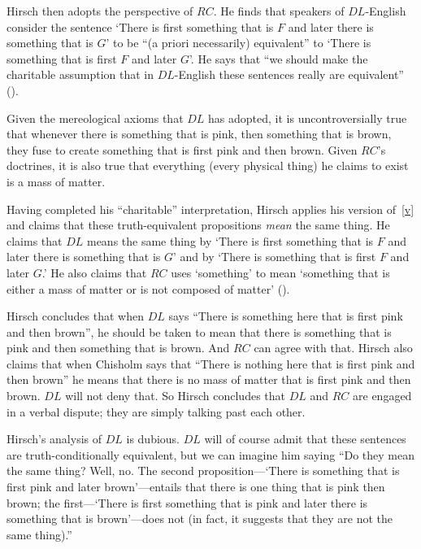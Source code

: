 \documentclass[11pt]{article}
\begin{document}
\begin{spacing}{1.25}
Hirsch then adopts the perspective of $RC$.  He finds that speakers of
$DL$-English consider the sentence `There is first something that is
$F$ and later there is something that is $G$' to be ``(a priori
necessarily) equivalent'' to `There is something that is first $F$ and
later $G$'.  He says that ``we should make the charitable assumption
that in $DL$-English these sentences really are
equivalent'' (\citeyear[78]{hirsch2005}).

Given the mereological axioms that $DL$ has adopted, it is
uncontroversially true that whenever there is something that is pink,
then something that is brown, they fuse to create something that is
first pink and then brown.  Given $RC$'s doctrines, it is also
true that everything (every physical thing) he claims to exist is a
mass of matter.

Having completed his ``charitable'' interpretation, Hirsch applies his
version of~\ref{v} and claims that these truth-equivalent propositions
{\em mean} the same thing.  He claims that $DL$ means the same thing
by `There is first something that is $F$ and later there is something
that is $G$' and by `There is something that is first $F$ and later
$G$.'  He also claims that $RC$ uses `something' to mean `something
that is either a mass of matter or is not composed of matter'
(\citeyear[76]{hirsch2005}).

Hirsch concludes that when $DL$ says ``There is something here that is
first pink and then brown'', he should be taken to mean that there is
something that is pink and then something that is brown.  And $RC$ can
agree with that.  Hirsch also claims that when Chisholm says that
``There is nothing here that is first pink and then brown'' he means
that there is no mass of matter that is first pink and then
brown.  $DL$ will not deny that.  So Hirsch concludes that $DL$ and
$RC$ are engaged in a verbal dispute; they are simply talking past
each other.

Hirsch's analysis of $DL$ is dubious.  $DL$ will of course admit that
these sentences are truth-conditionally equivalent, but we can imagine
him saying ``Do they mean the same thing?  Well, no.  The second
proposition---`There is something that is first pink and later
brown'---entails that there is one thing that is pink then brown; the
first---`There is first something that is pink and later there is
something that is brown'---does not (in fact, it suggests that they
are not the same thing).''


\end{spacing}
\end{document}

